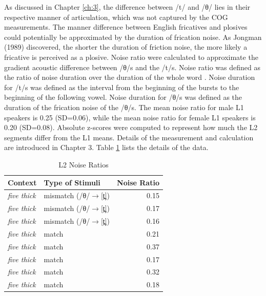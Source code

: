 As discussed in Chapter \ref{ch:3}, the difference between /t/ and /θ/ lies in their respective manner of articulation, which was not captured by the COG measurements. The manner difference between English fricatives and plosives could potentially be approximated by the duration of frication noise. As Jongman (1989) discovered, the shorter the duration of friction noise, the more likely a fricative is perceived as a plosive. Noise ratio were calculated to approximate the gradient acoustic difference between /θ/s and the /t/s. Noise ratio was defined as the ratio of noise duration over the duration of the whole word \citep{Jongman_2000}. Noise duration for /t/s was defined as the interval from the beginning of the bursts to the beginning of the following vowel. Noise duration for /θ/s was defined as the duration of the frication noise of the /θ/s. The mean noise ratio for male L1 speakers is 0.25 (SD=0.06), while the mean noise ratio for female L1 speakers is 0.20 (SD=0.08). Absolute z-scores were computed to represent how much the L2 segments differ from the L1 means. Details of the measurement and calculation are introduced in Chapter 3. Table \ref{tab:nr2} lists the details of the data.

\begin{table}[!h]
  \figSpace
  \centering
  \caption{L2 Noise Ratios}
    \begin{tabular}{llr}
    \toprule
    Context & Type of Stimuli & Noise Ratio \\
    \midrule
    \textit{five thick} & mismatch (/θ/$\rightarrow$[t̪]) & 0.15 \\
    \textit{five thick} & mismatch (/θ/$\rightarrow$[t̪]) & 0.17 \\
    \textit{five thick} & mismatch (/θ/$\rightarrow$[t̪]) & 0.16 \\
    \textit{five thick} & match & 0.21 \\
    \textit{five thick} & match & 0.37 \\
    \textit{five thick} & match & 0.17 \\
    \textit{five thick} & match & 0.32 \\
    \textit{five thick} & match & 0.18 \\
    \bottomrule
    \end{tabular}%
  \label{tab:nr2}%
    \figSpace
\end{table}%

